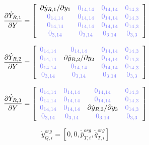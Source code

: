 \documentclass[a4paper,10pt]{article}
\begin{document}
\begin{equation}
\frac{\partial\dot{Y}_{R,1}}{\partial Y}=
\left[ \begin{array}{cccc}
\partial \dot{y}_{R,1} / \partial y_1 & \zm{14,14} & \zm{14,14} & \zm{14,3}\\
\zm{14,14}                            & \zm{14,14} & \zm{14,14} & \zm{14,3}\\
\zm{14,14}                            & \zm{14,14} & \zm{14,14} & \zm{14,3}\\
\zm{3,14}                             & \zm{3,14}  & \zm{3,14}  & \zm{3,3}\\
\end{array} \right]
\end{equation}

\begin{equation}
\frac{\partial\dot{Y}_{R,2}}{\partial Y}=
\left[ \begin{array}{cccc}
\zm{14,14} & \zm{14,14}                            & \zm{14,14} & \zm{14,3}\\
\zm{14,14} & \partial \dot{y}_{R,2} / \partial y_2 & \zm{14,14} & \zm{14,3}\\
\zm{14,14} & \zm{14,14}                            & \zm{14,14} & \zm{14,3}\\
\zm{3,14}  & \zm{3,14}                             & \zm{3,14}  & \zm{3,3}\\
\end{array}  \right]
\end{equation}

\begin{equation}
\frac{\partial\dot{Y}_{R,3}}{\partial Y}=
\left[ \begin{array}{cccc}
\zm{14,14} & \zm{14,14} & \zm{14,14}                            & \zm{14,3}\\
\zm{14,14} & \zm{14,14} & \zm{14,14}                            & \zm{14,3}\\
\zm{14,14} & \zm{14,14} & \partial \dot{y}_{R,3} / \partial y_3 & \zm{14,3}\\
\zm{3,14}  & \zm{3,14}  & \zm{3,14}                             & \zm{3,3}\\
\end{array}  \right]
\end{equation}


\begin{equation}
\dot{y}_{Q,i}^{org} = [0, 0, \ddot{\bar{p}}_{T,i}^{org}, \ddot{\bar{q}}_{T,i}^{org}]
\end{equation}
\end{document}
